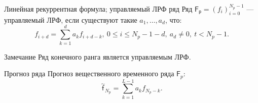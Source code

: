 \documentclass{beamer}
\begin{document}
    \begin{frame}
        \begin{block}{Линейная рекуррентная формула; управляемый ЛРФ ряд}
            Ряд $\mathsf{F_p} = (f_i)_{i=0}^{N_p-1}$ --- управляемый ЛРФ, если существуют такие $a_1, \dotso, a_d$, что:
            $$f_{i+d} = \sum_{k=1}^d a_k f_{i+d-k},\ 0 \leq i \leq N_p - 1 - d,\ a_d \neq 0,\ t < N_p - 1.$$
        \end{block}

        \begin{block}{Замечание}
            Ряд конечного ранга является управляемым ЛРФ.
        \end{block}
        
        \begin{block}{Прогноз ряда}
            Прогноз вещественного временного ряда $\mathsf{F}_p$:
            $$\overset{\sim}{\mathsf{f}}_{N_p} = \sum_{k=1}^{L-1} a_k f_{N_p-k}.$$
        \end{block}

    \end{frame}
\end{document}
